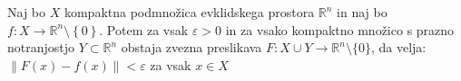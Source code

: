 \documentclass[mat1]{fmfdelo}
\newcommand{\R}{\mathbb R}
\newcommand{\N}{\mathbb N}
\newcommand{\0}{0}
\newcommand{\pU}{\mathcal U}
\begin{document}



\begin{lema}\label{lem:razsiritev-nic}
Naj bo $X$ kompaktna podmnožica evklidskega prostora $\R^n$ in naj bo \mbox{$f : X \to \R^n \setminus \left \{ \0 \right \}$}. Potem za vsak $\varepsilon > 0$ in za vsako kompaktno množico s prazno notranjostjo $Y \subset \R^n$ obstaja zvezna preslikava $F : X \cup Y \to \R^n \setminus \{ \0 \}$, da velja: $\| F(x)-f(x) \| < \varepsilon$  za vsak $x \in X$
\end{lema}
\end{document}
